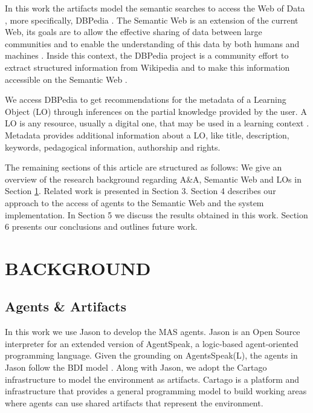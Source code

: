\documentclass[a4paper,twoside]{article}
\begin{document}
In this work the artifacts model the semantic searches to access the Web of Data \cite{refOPQ}, more specifically, DBPedia \cite{refXYZ}. The Semantic Web is an extension of the current Web, its goals are to allow the effective sharing of data between large communities and to enable the understanding of this data by both humans and machines \cite{ref53,ref54}. Inside this context, the DBPedia project is a community effort to extract structured information from Wikipedia and to make this information accessible on the Semantic Web \cite{refXYZ}.

We access DBPedia to get recommendations for the metadata of a Learning Object (LO) through inferences on the partial knowledge provided by the user. A LO is any resource, usually a digital one, that may be used in a learning context \cite{ref40}. Metadata provides additional information about a LO, like title, description, keywords, pedagogical information, authorship and rights.

The remaining sections of this article are structured as follows: We give an overview of the research background regarding A\&A, Semantic Web and LOs in Section  \ref{sec:background}. Related work is presented in Section 3. Section 4 describes our approach to the access of
agents to the Semantic Web and the system implementation. In Section 5 we discuss the results obtained in this work. Section 6 presents our conclusions and outlines future work.


\section{\uppercase{Background}}
\label{sec:background}

\subsection{Agents \& Artifacts}

\noindent In this work we use Jason to develop the MAS agents. Jason \cite{ref35} is an Open Source interpreter for an extended version of AgentSpeak, a logic-based agent-oriented programming language. Given the grounding on AgentsSpeak(L), the agents in Jason follow the BDI model \cite{ref20}. Along with Jason, we adopt the Cartago \cite{refCartago} infrastructure to model the environment as artifacts. Cartago is a platform and infrastructure that provides a general programming model to build working areas where agents can use shared artifacts that represent the environment.
\end{document}
